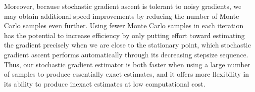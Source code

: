 \documentclass[paper=letter]{scrartcl}
\begin{document}


Moreover, because stochastic gradient ascent is tolerant to noisy gradients, we may obtain additional speed improvements by reducing the number of Monte Carlo samples even further.  
Using fewer Monte Carlo samples in each iteration has the potential to increase efficiency by only putting effort toward estimating the gradient precisely when we are close to the stationary point, which stochastic gradient ascent performs automatically through its decreasing stepsize sequence.  
Thus, our stochastic gradient estimator is both faster when using a large number of samples to produce essentially exact estimates, and it offers more flexibility in its ability to produce inexact estimates at low computational cost.





\end{document}
